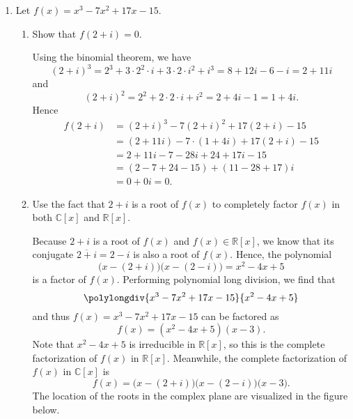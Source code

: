 \documentclass[11pt]{article}
\def\reals{\mathbb{R}}
\def\complex{\mathbb{C}}
\begin{document}
\begin{enumerate}
\begin{Solution}
\begin{proof}
 \end{proof}

\end{Solution}

 
 
 \item Let $f(x) = x^3 -7x^2 +17x -15$.
 \begin{enumerate}
 \item Show that $f(2+i)=0$.
 \begin{Solution}
  Using the binomial theorem, we have
  \[
   (2+i)^3 = 2^3 + 3\cdot 2^2\cdot i + 3\cdot 2\cdot i^2 + i^3 = 8 + 12i-6-i = 2+11i
  \]
  and 
  \[
   (2+i)^2 = 2^2 + 2\cdot 2\cdot i + i^2 = 2+4i-1 = 1+4i.
  \]
Hence
\begin{align*}
 f(2+i) &= (2+i)^3 -7(2+i)^2+17(2+i)-15\\
        &=(2+11i) -7\cdot (1+4i) + 17(2+i)-15\\
        & =2+11i - 7 -28i + 24 + 17 i - 15\\
        & =(2-7+24-15) + (11-28+17)i\\
        & = 0+0i = 0.
\end{align*}


 \end{Solution}

 \item Use the fact that $2+i$ is a root of $f(x)$ to completely factor $f(x)$ in both $\complex[x]$ and $\reals[x]$.
 \begin{Solution}
  Because $2+i$ is a root of $f(x)$ and $f(x)\in\reals[x]$, we know that its conjugate $\overline{2+i}=2-i$ is also a root of $f(x)$. Hence, the polynomial
  \[
   \bigl(x-(2+i)\bigr)\bigl(x-(2-i)\bigr) = x^2-4x+5
  \]
  is a factor of $f(x)$. Performing polynomial long division, we find that
  \[
    \polylongdiv{x^3 -7x^2 +17x -15}{x^2-4x+5}
  \]
and thus $f(x)=x^3 -7x^2 +17x -15$ can be factored as
\[
 f(x)=(x^2-4x+5)(x-3).
\]
Note that $x^2-4x+5$ is irreducible in $\reals[x]$, so this is the complete factorization of $f(x)$ in $\reals[x]$. Meanwhile, the complete factorization of $f(x)$ in $\complex[x]$ is
\[
  f(x)=\bigl(x-(2+i)\bigr)\bigl(x-(2-i)\bigr)\bigl(x-3\bigr).
\]
The location of the roots in the complex plane are visualized in the figure below.
\begin{center}
\end{center}
\end{Solution}


\end{enumerate}
\end{enumerate}
\end{document}
